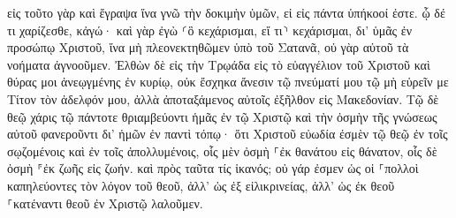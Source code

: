 \documentclass{openreader}
\begin{document}
εἰς τοῦτο γὰρ καὶ ἔγραψα ἵνα γνῶ τὴν δοκιμὴν ὑμῶν, εἰ εἰς πάντα ὑπήκοοί ἐστε. 
ᾧ δέ τι χαρίζεσθε, κἀγώ· καὶ γὰρ ἐγὼ ⸂ὃ κεχάρισμαι, εἴ τι⸃ κεχάρισμαι, δι’ ὑμᾶς ἐν προσώπῳ Χριστοῦ, 
ἵνα μὴ πλεονεκτηθῶμεν ὑπὸ τοῦ Σατανᾶ, οὐ γὰρ αὐτοῦ τὰ νοήματα ἀγνοοῦμεν. 
Ἐλθὼν δὲ εἰς τὴν Τρῳάδα εἰς τὸ εὐαγγέλιον τοῦ Χριστοῦ καὶ θύρας μοι ἀνεῳγμένης ἐν κυρίῳ, 
οὐκ ἔσχηκα ἄνεσιν τῷ πνεύματί μου τῷ μὴ εὑρεῖν με Τίτον τὸν ἀδελφόν μου, ἀλλὰ ἀποταξάμενος αὐτοῖς ἐξῆλθον εἰς Μακεδονίαν. 
Τῷ δὲ θεῷ χάρις τῷ πάντοτε θριαμβεύοντι ἡμᾶς ἐν τῷ Χριστῷ καὶ τὴν ὀσμὴν τῆς γνώσεως αὐτοῦ φανεροῦντι δι’ ἡμῶν ἐν παντὶ τόπῳ· 
ὅτι Χριστοῦ εὐωδία ἐσμὲν τῷ θεῷ ἐν τοῖς σῳζομένοις καὶ ἐν τοῖς ἀπολλυμένοις, 
οἷς μὲν ὀσμὴ ⸀ἐκ θανάτου εἰς θάνατον, οἷς δὲ ὀσμὴ ⸁ἐκ ζωῆς εἰς ζωήν. καὶ πρὸς ταῦτα τίς ἱκανός; 
οὐ γάρ ἐσμεν ὡς οἱ ⸀πολλοὶ καπηλεύοντες τὸν λόγον τοῦ θεοῦ, ἀλλ’ ὡς ἐξ εἰλικρινείας, ἀλλ’ ὡς ἐκ θεοῦ ⸀κατέναντι θεοῦ ἐν Χριστῷ λαλοῦμεν. 
\end{document}
